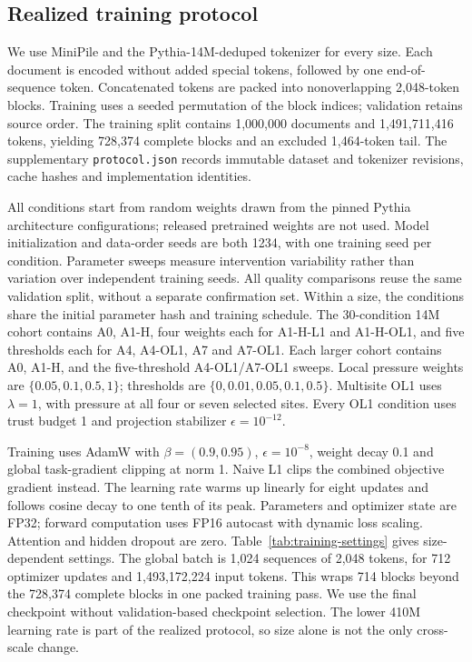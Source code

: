\subsection{Realized training protocol}
\label{app:training-protocol}

We use MiniPile and the Pythia-14M-deduped tokenizer for every size. Each document
is encoded without added special tokens, followed by one end-of-sequence token.
Concatenated tokens are packed into nonoverlapping 2,048-token blocks. Training
uses a seeded permutation of the block indices; validation retains source
order. The training split contains 1,000,000 documents and 1,491,711,416 tokens,
yielding 728,374 complete blocks and an excluded 1,464-token tail.
The supplementary \texttt{protocol.json} records immutable dataset and tokenizer
revisions, cache hashes and implementation identities.

All conditions start from random weights drawn from the pinned Pythia
architecture configurations; released pretrained weights are not used.
Model initialization and data-order seeds are both 1234, with one training
seed per condition. Parameter sweeps measure intervention variability rather
than variation over independent training seeds. All quality comparisons reuse
the same validation split, without a separate confirmation set. Within a size, the
conditions share the initial parameter hash and training schedule. The
30-condition 14M cohort contains A0, A1-H, four weights each for A1-H-L1 and
A1-H-OL1, and five thresholds each for A4, A4-OL1, A7 and A7-OL1. Each
larger cohort contains A0, A1-H, and the five-threshold A4-OL1/A7-OL1 sweeps.
Local pressure weights are $\{0.05,0.1,0.5,1\}$; thresholds are
$\{0,0.01,0.05,0.1,0.5\}$. Multisite OL1 uses $\lambda=1$, with pressure
at all four or seven selected sites. Every OL1 condition uses trust budget 1
and projection stabilizer $\epsilon=10^{-12}$.

Training uses AdamW with $\beta=(0.9,0.95)$, $\epsilon=10^{-8}$, weight
decay 0.1 and global task-gradient clipping at norm 1. Naive L1 clips the
combined objective gradient instead. The learning rate warms up linearly
for eight updates and follows cosine decay to one tenth of its peak.
Parameters and optimizer state are FP32; forward computation uses FP16
autocast with dynamic loss scaling. Attention and hidden dropout are zero.
Table~\ref{tab:training-settings} gives size-dependent settings. The global
batch is 1,024 sequences of 2,048 tokens, for 712 optimizer updates and
1,493,172,224 input tokens. This wraps 714 blocks beyond the 728,374 complete
blocks in one packed training pass. We use the final checkpoint without
validation-based checkpoint selection. The lower 410M learning rate is part
of the realized protocol, so size alone is not the only cross-scale change.

